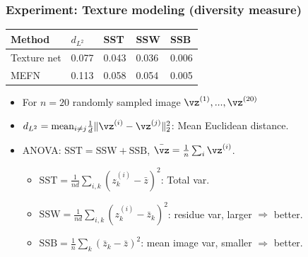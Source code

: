 \documentclass[16pt,presentation]{beamer}
\begin{document}
\begin{frame}
\frametitle{Experiment: Texture modeling (diversity measure)}
\centering
\begin{table}[htpb]
\begin{center}
\begin{tabular}{l | l | lll}
Method  & $d_{L^2}$& SST & SSW & SSB \\
\hline 
Texture net  & 0.077 & 0.043 & 0.036 & 0.006\\
MEFN   & \alert{0.113} & 0.058 & \alert{0.054} & \alert{0.005} \\
\end{tabular}
\end{center}
\begin{itemize}
\item For $n=20$ randomly sampled image $\vz^{(1)},...,\vz^{(20)}$
\item $d_{L^2} = \text{mean}_{i \neq j} \frac{1}{d}\|\vz^{(i)} - \vz^{(j)} \|_2^2$: Mean Euclidean distance.
\item ANOVA: $\text{SST} = \text{SSW} + \text{SSB}$, $\bar{\vz} = \frac{1}{n} \sum_{i} \vz^{(i)}$.
\begin{itemize}
\item $\text{SST} = \frac{1}{nd}\sum_{i,k} (z_k^{(i)} - \bar{z})^2$: Total var.
\item $\text{SSW} = \frac{1}{nd}\sum_{i,k} (z_k^{(i)} - \bar{z}_k)^2$: residue var, larger $\Rightarrow$ better.
\item $\text{SSB} = \frac{1}{n}\sum_{k} (\bar{z}_k - \bar{z})^2$: mean image var, smaller $\Rightarrow$ better.
\end{itemize}
\end{itemize}
\label{tab:texture}
\end{table}
\end{frame}
\end{document}
